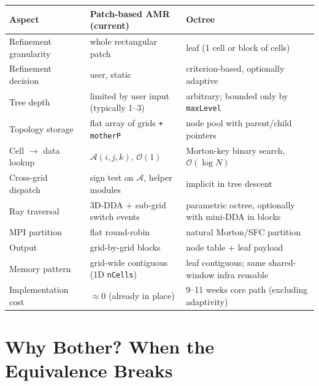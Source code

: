 \documentclass[11pt,a4paper]{my_memo}
\begin{document}
\begin{center}
\renewcommand{\arraystretch}{1.15}
\begin{tabular}{p{} p{} p{}}
\toprule
\textbf{Aspect} & \textbf{Patch-based AMR (current)} & \textbf{Octree} \\
\midrule
Refinement granularity
  & whole rectangular patch
  & leaf (1 cell or block of cells) \\
Refinement decision
  & user, static
  & criterion-based, optionally adaptive \\
Tree depth
  & limited by user input (typically 1--3)
  & arbitrary; bounded only by \texttt{maxLevel} \\
Topology storage
  & flat array of grids \texttt{+ motherP}
  & node pool with parent/child pointers \\
Cell $\to$ data lookup
  & $\mathcal{A}(i,j,k)$, $\mathcal{O}(1)$
  & Morton-key binary search, $\mathcal{O}(\log N)$ \\
Cross-grid dispatch
  & sign test on $\mathcal{A}$, helper modules
  & implicit in tree descent \\
Ray traversal
  & 3D-DDA + sub-grid switch events
  & parametric octree, optionally with mini-DDA in blocks \\
MPI partition
  & flat round-robin
  & natural Morton/SFC partition \\
Output
  & grid-by-grid blocks
  & node table + leaf payload \\
Memory pattern
  & grid-wide contiguous (1D \texttt{nCells})
  & leaf contiguous; same shared-window infra reusable \\
Implementation cost
  & $\approx$0 (already in place)
  & 9--11 weeks core path (excluding adaptivity) \\
\bottomrule
\end{tabular}
\end{center}

\section{Why Bother?  When the Equivalence Breaks}
\end{document}
